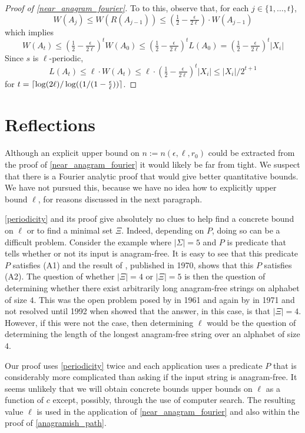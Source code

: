 \documentclass{patmorin}
\begin{document}
\begin{proof}[Proof of \cref{near_anagram_fourier}]
  To to this, observe that, for each $j\in\{1,\ldots,t\}$,
  \begin{equation}
      W(A_j)
        \le W(R(A_{j-1}))
        \le (\tfrac12-\tfrac{\epsilon}{2\ell})\cdot W(A_{j-1})
  \end{equation}
  which implies
  \[
       W(A_t)
       \le (\tfrac12-\tfrac{\epsilon}{2\ell})^t W(A_0) \le (\tfrac12-\tfrac{\epsilon}{2\ell})^t L(A_0)
       =  (\tfrac12-\tfrac{\epsilon}{2\ell})^t|X_i|
  \]
  Since $s$ is $\ell$-periodic,
  \[
        L(A_t)\le \ell\cdot W(A_t) \le \ell\cdot(\tfrac12-\tfrac{\epsilon}{2\ell})^t|X_i| \le |X_i|/2^{t+1}
  \]
  for $t = {\lceil \log(2\ell)/\log((1/(1-\tfrac{\epsilon}{\ell})) \rceil}$.
\end{proof}

\section{Reflections}

Although an explicit upper bound on $n:=n(\epsilon,\ell,r_0)$ could be extracted from the proof of \cref{near_anagram_fourier} it would likely be far from tight.  We suspect that there is a Fourier analytic proof that would give better quantitative bounds.  We have not pursued this, because we have no idea how to explicitly upper bound $\ell$, for reasons discussed in the next paragraph.

\cref{periodicity} and its proof give absolutely no clues to help find a concrete bound on $\ell$ or to find a minimal set $\Xi$. Indeed, depending on $P$, doing so can be a difficult problem.  Consider the example where $|\Sigma|=5$ and $P$ is predicate that tells whether or not its input is anagram-free. It is easy to see that this predicate $P$ satisfies (A1) and the result of \citet{pleasants:non-repetitive}, published in 1970, shows that this $P$ satisfies (A2).  The question of whether $|\Xi|=4$ or $|\Xi|=5$ is then the question of determining whether there exist arbitrarily long anagram-free strings on alphabet of size $4$.  This was the open problem posed by \citet{erdos:some} in 1961 and again by \citet{brown:is} in 1971 and not resolved until 1992 when \citet{keranen:abelian,keranen:powerful} showed that the answer, in this case, is that $|\Xi|=4$.  However, if this were not the case, then determining $\ell$ would be the question of determining the length of the longest anagram-free string over an alphabet of size $4$.

Our proof uses \cref{periodicity} twice and each application uses a predicate $P$ that is considerably more complicated than asking if the input string is anagram-free. It seems unlikely that we will obtain concrete bounds upper bounds on $\ell$ as a function of $c$ except, possibly, through the use of computer search. The resulting value $\ell$ is used in the application of \cref{near_anagram_fourier} and also within the proof of \cref{anagramish_path}.





\end{document}
